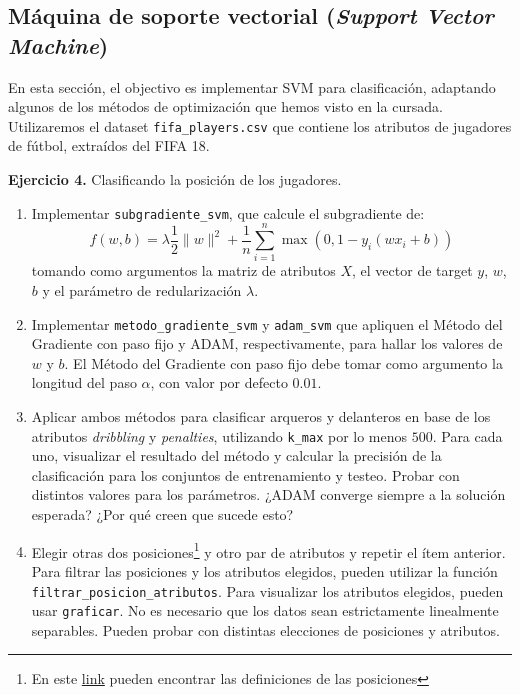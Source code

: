 \documentclass{article}
\begin{document}
    \subsection*{Máquina de soporte vectorial (\textit{Support Vector Machine})}

    En esta sección, el objectivo es implementar SVM  para clasificación, adaptando algunos de los métodos de
    optimización que hemos visto en la cursada.
    Utilizaremos el dataset \texttt{fifa\_players.csv} que contiene los atributos de jugadores de
    fútbol, extraídos del FIFA 18.

    \textbf{Ejercicio 4.} Clasificando la posición de los jugadores.

    \begin{enumerate}
        \item Implementar \texttt{subgradiente\_svm}, que calcule el subgradiente de:
        \[f(w,b) = \lambda\frac{1}{2}\lVert w\rVert^2 + \frac{1}{n}\sum_{i=1}^n \max(0, 1-y_i(wx_i+b))\]
        tomando como argumentos la matriz de atributos $X$, el vector de target $y$, $w$, $b$ y el parámetro de
        redularización $\lambda$.
        \item Implementar \texttt{metodo\_gradiente\_svm} y \texttt{adam\_svm} que apliquen el Método del Gradiente
        con paso fijo y ADAM, respectivamente, para hallar los valores de $w$ y $b$. El Método del Gradiente con
        paso fijo debe tomar como argumento la longitud del paso $\alpha$, con valor por defecto $0.01$.
        \item Aplicar ambos métodos para clasificar arqueros y delanteros en base de los atributos \textit{dribbling} y
        \textit{penalties}, utilizando \texttt{k\_max} por lo menos $500$. Para cada uno, visualizar el resultado del
        método y calcular la precisión de la clasificación para los conjuntos de entrenamiento y testeo. Probar con
        distintos valores para los parámetros. ¿ADAM converge siempre a la solución esperada? ¿Por qué creen que sucede esto?
        \item Elegir otras dos posiciones\footnote{En este \href{https://www.fifplay.com/encyclopedia/position/}{link}
        pueden encontrar las definiciones de las posiciones} y otro par de atributos y repetir el ítem anterior.
        Para filtrar las posiciones y los atributos elegidos, pueden utilizar la función
        \texttt{filtrar\_posicion\_atributos}. Para visualizar los atributos
        elegidos, pueden usar \texttt{graficar}. No es necesario que los datos sean estrictamente linealmente
        separables. Pueden probar con distintas elecciones de posiciones y atributos.
    \end{enumerate}
\end{document}

